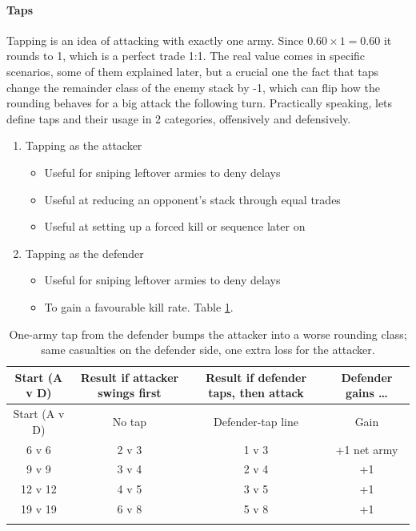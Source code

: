 \paragraph{Taps}

Tapping is an idea of attacking with exactly one army. Since $0.60 \times 1 = 0.60$ it rounds to 1, which is a perfect trade 1:1. The real value comes in specific scenarios, some of them explained later, but a crucial one the fact that taps change the remainder class of the enemy stack by -1, which can flip how the rounding behaves for a big attack the following turn. Practically speaking, lets define taps and their usage in 2 categories, offensively and defensively.

\begin{enumerate}
    \item Tapping as the attacker
    \begin{itemize}
        \item Useful for sniping leftover armies to deny delays
        \item Useful at reducing an opponent's stack through equal trades
        \item Useful at setting up a forced kill or sequence later on
    \end{itemize}
    \item Tapping as the defender
    \begin{itemize}
        \item Useful for sniping leftover armies to deny delays
        \item To gain a favourable kill rate. Table \ref{table:defenderTap}.
    \end{itemize}
\end{enumerate}

\scriptsize
\begin{longtable}{|c|c|c|c|}
\hline
\rowcolor{Baby_Blue}
Start (A v D) & Result if \textbf{attacker swings first} & Result if \textbf{defender taps, then attack} & Defender gains … \\ \hline\hline
\endfirsthead
\hline
\rowcolor{Baby_Blue}
Start (A v D) & No tap & Defender-tap line & Gain \\ \hline\hline
\endhead
6 v 6  & 2 v 3 & 1 v 3 & +1 net army \\ \hline
9 v 9  & 3 v 4 & 2 v 4 & +1 \\ \hline
12 v 12 & 4 v 5 & 3 v 5 & +1 \\ \hline
19 v 19 & 6 v 8 & 5 v 8 & +1 \\ \hline
\caption{One-army tap from the defender bumps the attacker into a worse rounding class; same casualties on the defender side, one extra loss for the attacker.}
\label{table:defenderTap}
\end{longtable}
\normalsize

